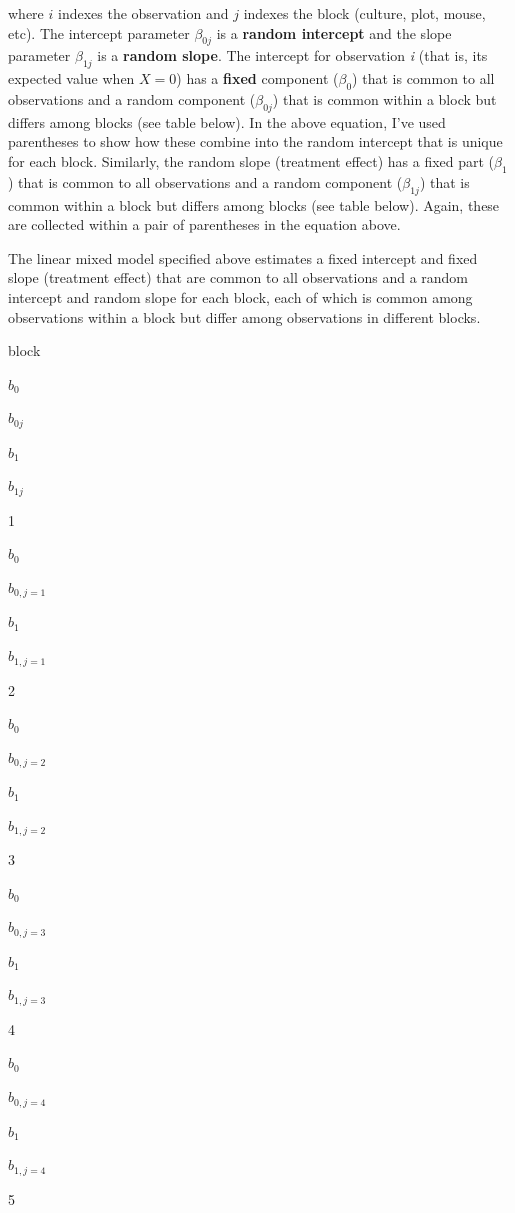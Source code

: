 \documentclass[]{book}
\begin{document}
where \(i\) indexes the observation and \(j\) indexes the block (culture, plot, mouse, etc). The intercept parameter \(\beta_{0j}\) is a \textbf{random intercept} and the slope parameter \(\beta_{1j}\) is a \textbf{random slope}. The intercept for observation \emph{i} (that is, its expected value when \(X=0\)) has a \textbf{fixed} component (\(\beta_0\)) that is common to all observations and a random component (\(\beta_{0j}\)) that is common within a block but differs among blocks (see table below). In the above equation, I've used parentheses to show how these combine into the random intercept that is unique for each block. Similarly, the random slope (treatment effect) has a fixed part (\(\beta_1\)) that is common to all observations and a random component (\(\beta_{1j}\)) that is common within a block but differs among blocks (see table below). Again, these are collected within a pair of parentheses in the equation above.

\label{tab:lmm-table}The linear mixed model specified above estimates a fixed intercept and fixed slope (treatment effect) that are common to all observations and a random intercept and random slope for each block, each of which is common among observations within a block but differ among observations in different blocks.

block

\(b_0\)

\(b_{0j}\)

\(b_1\)

\(b_{1j}\)

1

\(b_0\)

\(b_{0,j=1}\)

\(b_1\)

\(b_{1,j=1}\)

2

\(b_0\)

\(b_{0,j=2}\)

\(b_1\)

\(b_{1,j=2}\)

3

\(b_0\)

\(b_{0,j=3}\)

\(b_1\)

\(b_{1,j=3}\)

4

\(b_0\)

\(b_{0,j=4}\)

\(b_1\)

\(b_{1,j=4}\)

5
\end{document}
